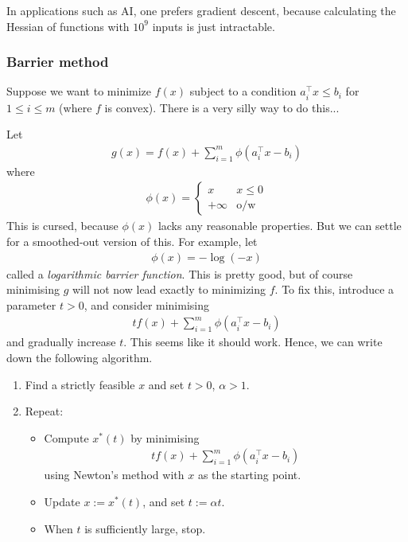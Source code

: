 \documentclass{../../template/note}
\begin{document}
    \begin{remark*}
        In applications such as AI, one prefers gradient descent, because calculating the Hessian of functions with $10^9$ inputs is just intractable.
    \end{remark*}
    
    \subsubsection{Barrier method}

    Suppose we want to minimize $f(x)$ subject to a condition $a_i^\intercal x \leq b_i$ for $1 \leq i \leq m$ (where $f$ is convex). There is a very silly way to do this...

    Let
    \begin{align*}
        g(x) = f(x) + \sum_{i=1}^m \phi(a_i^\intercal x - b_i)
    \end{align*}
    where
    \begin{align*}
        \phi(x) = \begin{cases}
            x & x \leq 0 \\
            +\infty & \text{o/w}
        \end{cases}
    \end{align*}
    This is cursed, because $\phi(x)$ lacks any reasonable properties. But we can settle for a smoothed-out version of this. For example, let
    \begin{align*}
        \phi(x) = -\log(-x)
    \end{align*}
    called a \emph{logarithmic barrier function}. This is pretty good, but of course minimising $g$ will not now lead exactly to minimizing $f$. To fix this, introduce a parameter $t >0$, and consider minimising
    \begin{align*}
        tf(x) + \sum_{i=1}^m \phi(a_i^\intercal x - b_i)
    \end{align*}
    and gradually increase $t$. This seems like it should work. Hence, we can write down the following algorithm.

    \begin{algorithm}
        \begin{enumerate}[label=\protect\circled{\arabic*}]
            \item Find a strictly feasible $x$ and set $t > 0$, $\alpha > 1$.
            \item Repeat:
            \begin{itemize}
                \item Compute $x^*(t)$ by minimising
                \begin{align*}
                    tf(x) + \sum_{i=1}^m \phi(a_i^\intercal x - b_i)
                \end{align*}
                using Newton's method with $x$ as the starting point.
                \item Update $x := x^*(t)$, and set $t := \alpha t$.
                \item When $t$ is sufficiently large, stop.
            \end{itemize}
        \end{enumerate}
    \end{algorithm}
\end{document}
